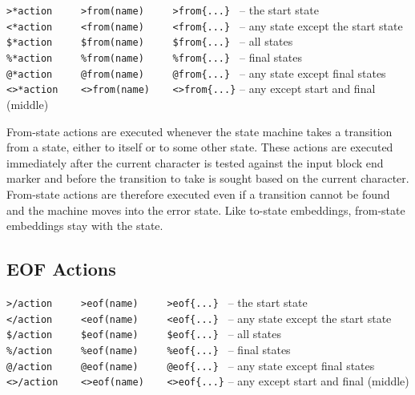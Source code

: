 \documentclass[letterpaper,11pt,oneside]{book}
\begin{document}
\noindent\hspace*{24pt}\verb|>*action     >from(name)     >from{...} | -- the start state\\
\noindent\hspace*{24pt}\verb|<*action     <from(name)     <from{...} | -- any state except the start state\\
\noindent\hspace*{24pt}\verb|$*action     $from(name)     $from{...} | -- all states\\
\noindent\hspace*{24pt}\verb|%*action     %from(name)     %from{...} | -- final states\\
\noindent\hspace*{24pt}\verb|@*action     @from(name)     @from{...} | -- any state except final states\\
\noindent\hspace*{24pt}\verb|<>*action    <>from(name)    <>from{...}| -- any except start and final (middle)
\vspace{12pt}

From-state actions are executed whenever the state machine takes a transition from a
state, either to itself or to some other state. These actions are executed
immediately after the current character is tested against the input block end
marker and before the transition to take is sought based on the current
character. From-state actions are therefore executed even if a transition
cannot be found and the machine moves into the error state.  Like to-state
embeddings, from-state embeddings stay with the state.

\subsection{EOF Actions}

\noindent\hspace*{24pt}\verb|>/action     >eof(name)     >eof{...} | -- the start state\\
\noindent\hspace*{24pt}\verb|</action     <eof(name)     <eof{...} | -- any state except the start state\\
\noindent\hspace*{24pt}\verb|$/action     $eof(name)     $eof{...} | -- all states\\
\noindent\hspace*{24pt}\verb|%/action     %eof(name)     %eof{...} | -- final states\\
\noindent\hspace*{24pt}\verb|@/action     @eof(name)     @eof{...} | -- any state except final states\\
\noindent\hspace*{24pt}\verb|<>/action    <>eof(name)    <>eof{...}| -- any except start and final (middle)
\vspace{12pt}
\end{document}

